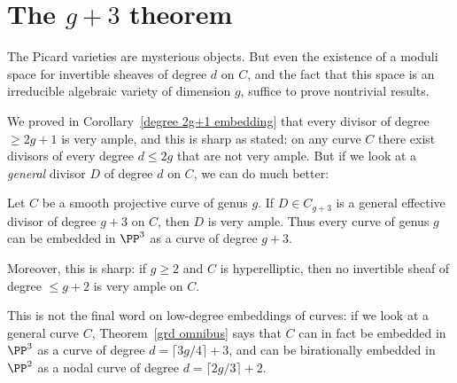 \section{The $g+3$ theorem}\label{g+3 section}

The Picard varieties are mysterious objects.  But even the 
existence of
a  moduli space for invertible sheaves of degree $d$ on $C$, and 
the fact
that this space is an irreducible algebraic variety of dimension $g$,
suffice to prove nontrivial results. 

We proved in Corollary~\ref{degree 2g+1 embedding} that every divisor
of degree $\geq 2g+1$ is very ample, and this is sharp as stated: on
any curve $C$ there exist divisors of every degree $d \leq 2g$ that
are not very ample. But if we look at a \emph{general} divisor $D$ of
degree $d$ on  $C$, we can do much better: 

\begin{theorem}[$g+3$ theorem]\label{g+3 theorem}
Let $C$ be a smooth projective curve of genus $g$. If $D \in C_{g+3}$
is a general effective divisor of degree $g+3$ on $C$, then $D$ is 
very ample.
%
%
Thus
every curve of genus $g$ 
can
be embedded in $\PP^3$ as a curve of degree $g+3$.

Moreover, this is sharp: if $g\geq 2$ and $C$ is 
hyperelliptic,
%
then no invertible sheaf of degree $\leq g+2$ is very ample on $C$.
\end{theorem}

This is not the final word on low-degree embeddings of curves: if we look at a general curve $C$, Theorem~\ref{grd omnibus} says that $C$ can in fact be embedded in $\PP^{3}$ as a curve of degree $d = \lceil 3g/4 \rceil + 3$, and can be birationally embedded in $\PP^2$ as a nodal curve of degree $d = \lceil 2g/3 \rceil + 2$.

